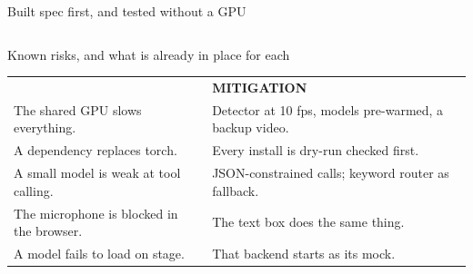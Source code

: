 \begin{frame}{Built spec first, and tested without a GPU}
  \begin{columns}[T,onlytextwidth]
  \end{columns}
\end{frame}

\begin{frame}{Known risks, and what is already in place for each}
  \footnotesize
  \begin{tabular}{@{}>{\raggedright\arraybackslash}p{}>{\raggedright\arraybackslash}p{}@{}}
    {\scriptsize\bfseries\color{triadPrimary}RISK} & {\scriptsize\bfseries\color{triadPrimary}MITIGATION}\\[1.0ex]
    The shared GPU slows everything. & \textcolor{triadMuted}{Detector at 10 fps, models pre-warmed, a backup video.}\\[0.7ex]
    A dependency replaces torch. & \textcolor{triadMuted}{Every install is dry-run checked first.}\\[0.7ex]
    A small model is weak at tool calling. & \textcolor{triadMuted}{JSON-constrained calls; keyword router as fallback.}\\[0.7ex]
    The microphone is blocked in the browser. & \textcolor{triadMuted}{The text box does the same thing.}\\[0.7ex]
    A model fails to load on stage. & \textcolor{triadMuted}{That backend starts as its mock.}\\
  \end{tabular}
\end{frame}
\renewcommand{\arraystretch}{1.0}
